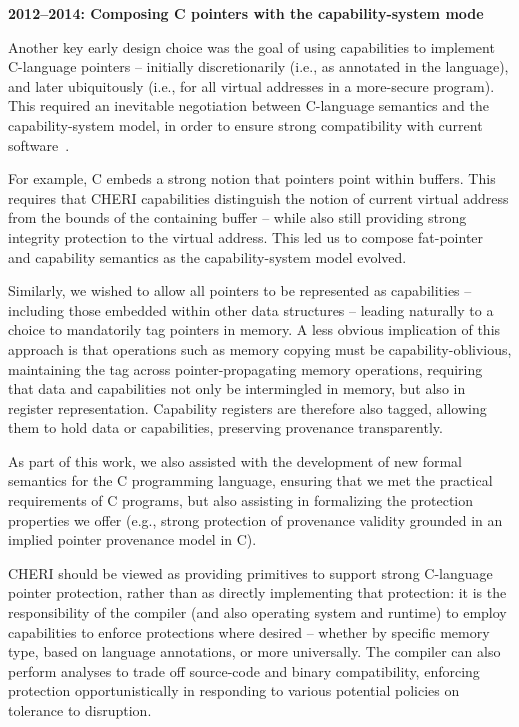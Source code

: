 \medskip
\noindent
\textbf{2012--2014: Composing C pointers with the capability-system mode}

\smallskip
\noindent
Another key early design choice was the goal of using capabilities to
implement C-language pointers -- initially discretionarily (i.e., as annotated
in the language), and later ubiquitously (i.e., for all virtual addresses in a 
more-secure program).
This required an inevitable negotiation between C-language semantics and the
capability-system model, in order to ensure strong compatibility with current
software~\cite{ChisnallCPDP11,Cerberus-PLDI16}.

For example, C embeds a strong notion that pointers point within buffers.
This requires that CHERI capabilities distinguish the notion of current virtual
address from the bounds of the containing buffer -- while also still providing
strong integrity protection to the virtual address.
This led us to compose
fat-pointer~\cite{trevor:cyclone,Nagarakatte:2009:SHC:1542476.1542504,Necula:2002:CTR:503272.503286} and capability
semantics as the capability-system model evolved.

Similarly, we wished to allow all pointers to be represented as capabilities
-- including those embedded within other data structures -- leading naturally
to a choice to mandatorily tag pointers in memory.
A less obvious implication of this approach is that operations such as memory
copying must be capability-oblivious, maintaining the tag across
pointer-propagating memory operations, requiring that data and capabilities
not only be intermingled in memory, but also in register representation.
Capability registers are therefore also tagged, allowing them to hold data or
capabilities, preserving provenance transparently.

As part of this work, we also assisted with the development of new formal
semantics for the C programming language, ensuring that we met the practical
requirements of C programs, but also assisting in formalizing the protection
properties we offer (e.g., strong protection of provenance validity grounded
in an implied pointer provenance model in C).

CHERI should be viewed as providing primitives to support strong C-language
pointer protection, rather than as directly implementing that protection: it
is the responsibility of the compiler (and also operating system and
runtime) to employ capabilities to enforce protections where desired --
whether by specific memory type, based on language annotations, or more
universally.
The compiler can also perform analyses to trade off source-code and binary
compatibility, enforcing protection opportunistically in responding to various
potential policies on tolerance to disruption.

